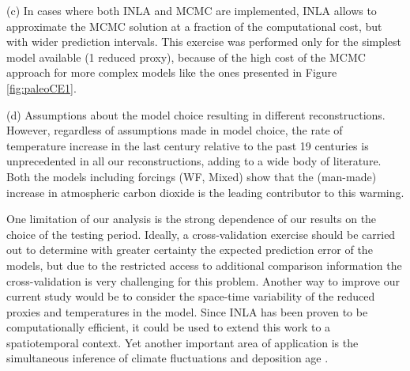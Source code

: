 \documentclass[12pt]{amsart}
\theoremstyle{plain}
\theoremstyle{definition}
\theoremstyle{remark}
\begin{document}
     \noindent (c) In cases where both INLA and MCMC are implemented, INLA allows to approximate the MCMC
      solution at a fraction of the computational cost, but with wider
      prediction intervals. This exercise was performed only for the simplest
      model available (1 reduced proxy), because of the high cost of the
      MCMC approach for more complex models like the ones presented in Figure
      \ref{fig:paleoCE1}. 
      
     \noindent (d) Assumptions about the model choice  resulting in different reconstructions. However, regardless of assumptions made in model choice, the rate of
    temperature increase in the last century relative to the past 19 centuries is unprecedented in all our reconstructions, adding to a wide body of literature. Both the models including forcings (WF, Mixed) show that the (man-made) increase in atmospheric carbon dioxide is the leading contributor to this warming.  

One limitation of our analysis is the strong
dependence of our results on the choice of the testing period. Ideally, a
cross-validation exercise should be carried out to determine with greater
certainty the expected prediction error of the models, but due to the restricted access to
additional comparison information the cross-validation is very challenging for this problem. 
Another way to improve our current study would be to consider the space-time variability of the reduced proxies and temperatures in the model. 
Since INLA has been proven to be computationally
efficient, it could be used to extend this work to a spatiotemporal context. Yet another important area of application is the simultaneous inference of climate fluctuations and deposition age \citep{Sweeney:WIRES2018}.



\end{document}
